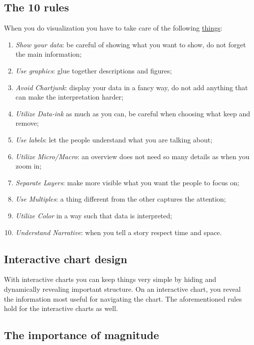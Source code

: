 \subsection*{The 10 rules}

When you do visualization you have to take care of the following \href{http://www.sealthreinhold.com/school/tuftes-rules/}{things}:

\begin{enumerate}
\item \emph{Show your data}: be careful of showing what you want to show, do not forget the main information;
\item \emph{Use graphics}: glue together descriptions and figures;
\item \emph{Avoid Chartjunk}: display your data in a fancy way, do not add anything that can make the interpretation harder;
\item \emph{Utilize Data-ink} as much as you can, be careful when choosing what keep and remove;
\item \emph{Use labels}: let the people understand what you are talking about;
\item \emph{Utilize Micro/Macro}: an overview does not need so many details as when you zoom in;
\item \emph{Separate Layers}: make more visible what you want the people to focus on;
\item \emph{Use Multiples}: a thing different from the other captures the attention;
\item \emph{Utilize Color} in a way such that data is interpreted;
\item \emph{Understand Narrative}: when you tell a story respect time and space.
\end{enumerate}

\subsection*{Interactive chart design}

With interactive charts you can keep things very simple by hiding and dynamically revealing important structure.
On an interactive chart, you reveal the information most useful for navigating the chart. The aforementioned rules hold for the interactive charts as well.

\subsection*{The importance of magnitude}

